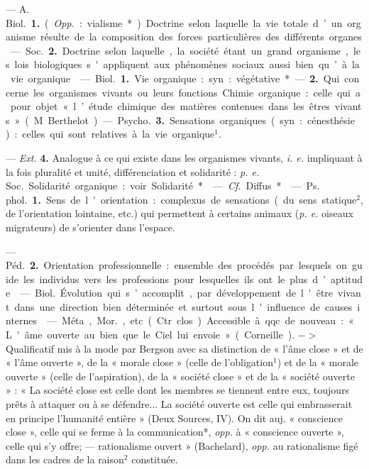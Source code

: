 \begin{itemize}[leftmargin=1cm, label=, itemsep=1pt]
 — A. \si{Biol.} {\bf 1.} ({\it Opp.} :
vialisme*). Doctrine selon laquelle
la vie totale d’un organisme résulte
de la composition des forces particulières des différents organes. —
\si{Soc.} {\bf 2.} Doctrine selon laquelle, la
société étant un grand organisme,
les lois biologiques s'appliquent aux
phénomènes sociaux aussi bien qu’à
la vie organique.

 — \si{Biol.} {\bf 1.} Vie organique :
syn. : végétative*. — {\bf 2.} Qui concerne
les organismes vivants ou leurs
fonctions. Chimie organique : celle
qui a pour objet « l’étude chimique
des matières contenues dans les
êtres vivants » (M. Berthelot).

— \si{Psycho.} {\bf 3.} Sensations organiques (syn. : cénesthésie) : celles qui
sont relatives à la vie organique$^1$.

— {\it Ext.} {\bf 4.} Analogue à ce qui
existe dans les organismes vivants,
{\it i. e.} impliquant à la fois pluralité et
unité, différenciation et solidarité :
{\it p. e.} \si{Soc.} Solidarité organique : voir
Solidarité*.

 — {\it Cf.} Diffus*.

 — \si{Ps. phol.} {\bf 1.} Sens de
l'orientation : complexus de sensations (du sens statique$^2$, de l’orientation lointaine, etc.) qui permettent
à certains animaux ({\it p. e.} oiseaux migrateurs) de s'orienter dans l’espace.

— \si{Péd.} {\bf 2.} Orientation professionnelle : ensemble des procédés par
lesquels on guide les individus vers
les professions pour lesquelles ils
ont le plus d’aptitude.

 — \si{Biol.} Évolution qui
s’accomplit, par développement de
l'être vivant dans une direction
bien déterminée et surtout sous
l'influence de causes internes.

 — Méta, \si{Mor.}, etc. (Ctr.
clos). Accessible à qqc. de nouveau :
« L'âme ouverte au bien que le Ciel
lui envoie » (Corneille). $->$ Qualificatif mis à la mode par Bergson
avec sa distinction de « l’âme close »
et de « l'âme ouverte », de la « morale
close » (celle de l'obligation$^1$) et de
la « morale ouverte » (celle de l’aspiration), de la « société close » et de la
« société ouverte » : « La société close
est celle dont les membres se tiennent entre eux, toujours prêts à
attaquer ou à se défendre... La
société ouverte est celle qui embrasserait en principe l'humanité entière » (Deux Sources, IV). On dit auj.
« conscience close », celle qui se
ferme à la communication*, {\it opp.} à
« conscience ouverte », celle qui s’y
offre; — rationalisme ouvert »
(Bachelard), {\it opp.} au rationalisme
figé dans les cadres de la raison$^2$
constituée.

	\end{itemize}
